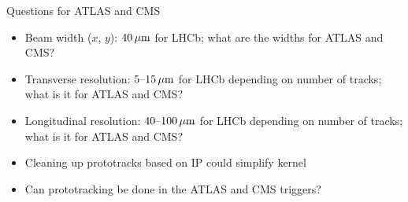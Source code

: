 \begin{frame}{Questions for ATLAS and CMS}
    \begin{itemize}
      \item
          Beam width ($x$, $y$): $\unit[40]{\mu m}$ for LHCb; what are the widths for ATLAS and CMS?
      \item
          Transverse resolution: $\unit[5\textup{--}15]{\mu m}$ for LHCb depending on number of tracks; what is it for ATLAS and CMS?
      \item
          Longitudinal resolution: $\unit[40\textup{--}100]{\mu m}$ for LHCb depending on number of tracks; what is it for ATLAS and CMS?
      \item
          Cleaning up prototracks based on IP could simplify kernel
      \item
          Can prototracking be done in the ATLAS and CMS triggers?
    \end{itemize}
\end{frame}
